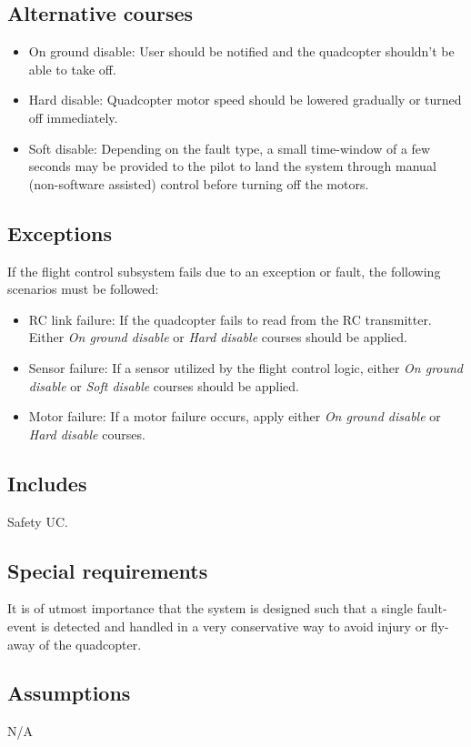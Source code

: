 \documentclass[a4paper]{article}
\begin{document}
\subsection{Alternative courses}
\begin{itemize}
	\item On ground disable: User should be notified and the quadcopter shouldn't be able to take off.
	\item Hard disable: Quadcopter motor speed should be lowered gradually or turned off immediately. 
	\item Soft disable: Depending on the fault type, a small time-window of a few seconds may be provided to the pilot to land the system through manual (non-software assisted) control before turning off the motors.
\end{itemize}

\subsection{Exceptions}
If the flight control subsystem fails due to an exception or fault, the following scenarios must be followed:
\begin{itemize}
	\item RC link failure: If the quadcopter fails to read from the RC transmitter. Either \emph{On ground disable} or \emph{Hard disable} courses should be applied.
	\item Sensor failure: If a sensor utilized by the flight control logic, either \emph{On ground disable} or \emph{Soft disable} courses should be applied.
	\item Motor failure: If a motor failure occurs, apply either \emph{On ground disable} or \emph{Hard disable} courses.
\end{itemize}

\subsection{Includes}
Safety UC.

\subsection{Special requirements}
It is of utmost importance that the system is designed such that a single fault-event is detected and handled in a very conservative way to avoid injury or fly-away of the quadcopter.

\subsection{Assumptions}
N/A
\end{document}
